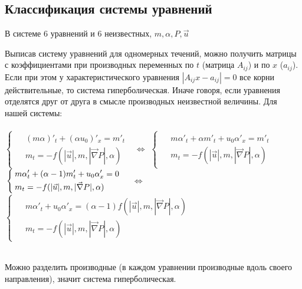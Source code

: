 \documentclass[a4paper,12pt]{article}
\begin{document}
\subsection{Классификация системы уравнений}
\par В системе 6 уравнений и 6 неизвестных, $m, \alpha, P, \vec{u}$\\
\par Выписав систему уравнений для одномерных течений, можно получить матрицы с коэффициентами при производных переменных по $t$ (матрица $A_{ij}$) и по $x$ ($a_{ij}$). Если при этом у характеристического уравнения $|A_{ij}x-a_{ij}|=0$ все корни действительные, то система гиперболическая. Иначе говоря, если уравнения отделятся друг от друга в смысле производных неизвестной величины. Для нашей системы:\\
\bigskip
\\
$
\begin{cases}
\begin{aligned}
&(m\alpha)'_{t}+(\alpha u_{0})'_{x}=m'_{t}\\
&m_{t}=-f(|\vec{u}|, m,|\vec{\nabla} P| , \alpha)
\end{aligned}
\end{cases}$
$\Leftrightarrow$
$
\begin{cases}
\begin{aligned}
&m\alpha'_{t}+\alpha m'_{t}+u_{0}\alpha'_{x}=m'_{t}\\
&m_{t}=-f(|\vec{u}|, m,|\vec{\nabla} P| , \alpha)
\end{aligned}
\end{cases}$\\
\medskip
$\\
\begin{cases}
\begin{aligned}
&m\alpha'_{t}+(\alpha-1) m'_{t}+u_{0}\alpha'_{x}=0\\
&m_{t}=-f(|\vec{u}|, m,|\vec{\nabla} P| , \alpha)
\end{aligned}
\end{cases}$
$\Leftrightarrow$
$
\begin{cases}
\begin{aligned}
&m\alpha'_{t}+u_{0}\alpha'_{x}=(\alpha-1)f(|\vec{u}|, m,|\vec{\nabla} P| , \alpha)\\
&m_{t}=-f(|\vec{u}|, m,|\vec{\nabla} P| , \alpha)
\end{aligned}
\end{cases}$\\
\bigskip
\\
\par Можно разделить производные (в каждом уравнении производные вдоль своего направления), значит система гиперболическая.
\pagebreak
\end{document}
